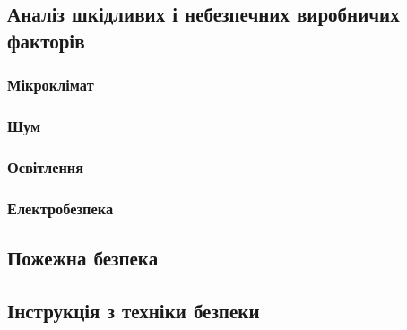 \documentclass[simple,14pt,utf8,ukrainian]{eskdtext}
\begin{document}
  \subsection{Аналіз шкідливих і небезпечних виробничих факторів}
    \subsubsection{Мікроклімат}
    \subsubsection{Шум}
    \subsubsection{Освітлення}
    \subsubsection{Електробезпека}
  \subsection{Пожежна безпека}
  \subsection{Інструкція з техніки безпеки}
    
    
\end{document}
